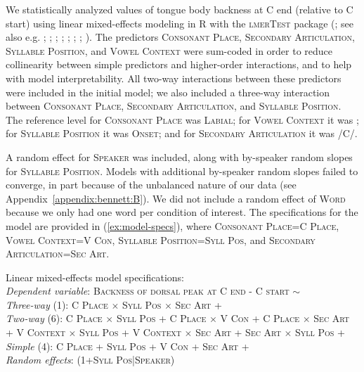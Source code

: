 \documentclass[output=paper,colorlinks,citecolor=brown]{langscibook}
\newcommand{\pal}{\ipa{ʲ}}
\begin{document}
We statistically analyzed values of tongue body backness at C end (relative to C start) using linear mixed-effects modeling in \textsc{R} \citep{RStats}  with the \textsc{lmerTest} package (\citealt{lmerTest}; see also e.g. \citealt{Pinheiro_Bates2000_mixed_effects_book}; \cite{Gelman_Hill2006_regression_BOOK}; \cite{Baayen_etal2008_random_effects}; \cite{Bolker_etal2009_glms_prac_guide}; \cite{Barr_etal2013_max_rand_effects}; \cite{Matuschek_etal2017_error_power_mixed_models}; \cite{Tomaschek_etal2018_collinearity}; \cite{Oberpriller_etal2022_fixed_or_random}). The predictors \textsc{Consonant Place}, \textsc{Secondary Articulation}, \textsc{Syllable Position}, and \textsc{Vowel Context} were sum-coded in order to reduce collinearity between simple predictors and higher-order interactions, and to help with model interpretability. All two-way interactions between these predictors were included in the initial model; we also included a three-way interaction between \textsc{Consonant Place, Secondary Articulation}, and \textsc{Syllable Position}. The reference level for \textsc{Consonant Place} was \textsc{Labial}; for \textsc{Vowel Context} it was ; for \textsc{Syllable Position} it was \textsc{Onset}; and for \textsc{Secondary Articulation} it was /C\pal/.

A random effect for \textsc{Speaker} was included, along with by-speaker random slopes for \textsc{Syllable Position}. Models with additional by-speaker random slopes failed to converge, in part because of the unbalanced nature of our data (see Appendix~\ref{appendix:bennett:B}). We did not include a random effect of \textsc{Word} because we only had one word per condition of interest. The specifications for the model are provided in (\ref{ex:model-specs}), where \textsc{Consonant Place}=\textsc{C Place}, \textsc{Vowel Context}=\textsc{V Con}, \textsc{Syllable Position}=\textsc{Syll Pos}, and \textsc{Secondary Articulation}=\textsc{Sec Art}.

\begin{exe}
\ex Linear mixed-effects model specifications:\\ 
\emph{Dependent variable}:
\textsc{Backness of dorsal peak at C end - C start $\sim$\\
}
\emph{Three-way} (1): \textsc{C Place $\times$ Syll Pos $\times$ Sec Art} +\\
\emph{Two-way} (6): \textsc{
C Place $\times$ Syll Pos + 
C Place $\times$ V Con +
C Place $\times$ Sec Art + 
V Context $\times$ Syll Pos +
V Context $\times$ Sec Art +  
Sec Art $\times$ Syll Pos +\\
}
\emph{Simple} (4): \textsc{C Place + Syll Pos + V Con + Sec Art} +\\
\emph{Random effects}: \textsc{(1+Syll Pos|Speaker)}
\label{ex:model-specs}
\end{exe}
\end{document}
